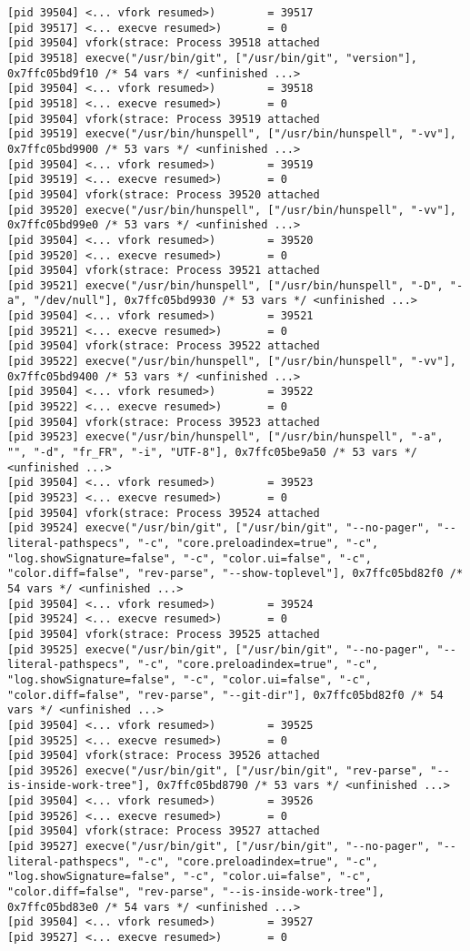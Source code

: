 \documentclass[11pt]{article}
\begin{document}
\begin{lstlisting}
[pid 39504] <... vfork resumed>)        = 39517
[pid 39517] <... execve resumed>)       = 0
[pid 39504] vfork(strace: Process 39518 attached
[pid 39518] execve("/usr/bin/git", ["/usr/bin/git", "version"], 0x7ffc05bd9f10 /* 54 vars */ <unfinished ...>
[pid 39504] <... vfork resumed>)        = 39518
[pid 39518] <... execve resumed>)       = 0
[pid 39504] vfork(strace: Process 39519 attached
[pid 39519] execve("/usr/bin/hunspell", ["/usr/bin/hunspell", "-vv"], 0x7ffc05bd9900 /* 53 vars */ <unfinished ...>
[pid 39504] <... vfork resumed>)        = 39519
[pid 39519] <... execve resumed>)       = 0
[pid 39504] vfork(strace: Process 39520 attached
[pid 39520] execve("/usr/bin/hunspell", ["/usr/bin/hunspell", "-vv"], 0x7ffc05bd99e0 /* 53 vars */ <unfinished ...>
[pid 39504] <... vfork resumed>)        = 39520
[pid 39520] <... execve resumed>)       = 0
[pid 39504] vfork(strace: Process 39521 attached
[pid 39521] execve("/usr/bin/hunspell", ["/usr/bin/hunspell", "-D", "-a", "/dev/null"], 0x7ffc05bd9930 /* 53 vars */ <unfinished ...>
[pid 39504] <... vfork resumed>)        = 39521
[pid 39521] <... execve resumed>)       = 0
[pid 39504] vfork(strace: Process 39522 attached
[pid 39522] execve("/usr/bin/hunspell", ["/usr/bin/hunspell", "-vv"], 0x7ffc05bd9400 /* 53 vars */ <unfinished ...>
[pid 39504] <... vfork resumed>)        = 39522
[pid 39522] <... execve resumed>)       = 0
[pid 39504] vfork(strace: Process 39523 attached
[pid 39523] execve("/usr/bin/hunspell", ["/usr/bin/hunspell", "-a", "", "-d", "fr_FR", "-i", "UTF-8"], 0x7ffc05be9a50 /* 53 vars */ <unfinished ...>
[pid 39504] <... vfork resumed>)        = 39523
[pid 39523] <... execve resumed>)       = 0
[pid 39504] vfork(strace: Process 39524 attached
[pid 39524] execve("/usr/bin/git", ["/usr/bin/git", "--no-pager", "--literal-pathspecs", "-c", "core.preloadindex=true", "-c", "log.showSignature=false", "-c", "color.ui=false", "-c", "color.diff=false", "rev-parse", "--show-toplevel"], 0x7ffc05bd82f0 /* 54 vars */ <unfinished ...>
[pid 39504] <... vfork resumed>)        = 39524
[pid 39524] <... execve resumed>)       = 0
[pid 39504] vfork(strace: Process 39525 attached
[pid 39525] execve("/usr/bin/git", ["/usr/bin/git", "--no-pager", "--literal-pathspecs", "-c", "core.preloadindex=true", "-c", "log.showSignature=false", "-c", "color.ui=false", "-c", "color.diff=false", "rev-parse", "--git-dir"], 0x7ffc05bd82f0 /* 54 vars */ <unfinished ...>
[pid 39504] <... vfork resumed>)        = 39525
[pid 39525] <... execve resumed>)       = 0
[pid 39504] vfork(strace: Process 39526 attached
[pid 39526] execve("/usr/bin/git", ["/usr/bin/git", "rev-parse", "--is-inside-work-tree"], 0x7ffc05bd8790 /* 53 vars */ <unfinished ...>
[pid 39504] <... vfork resumed>)        = 39526
[pid 39526] <... execve resumed>)       = 0
[pid 39504] vfork(strace: Process 39527 attached
[pid 39527] execve("/usr/bin/git", ["/usr/bin/git", "--no-pager", "--literal-pathspecs", "-c", "core.preloadindex=true", "-c", "log.showSignature=false", "-c", "color.ui=false", "-c", "color.diff=false", "rev-parse", "--is-inside-work-tree"], 0x7ffc05bd83e0 /* 54 vars */ <unfinished ...>
[pid 39504] <... vfork resumed>)        = 39527
[pid 39527] <... execve resumed>)       = 0
\end{lstlisting}
\end{document}
